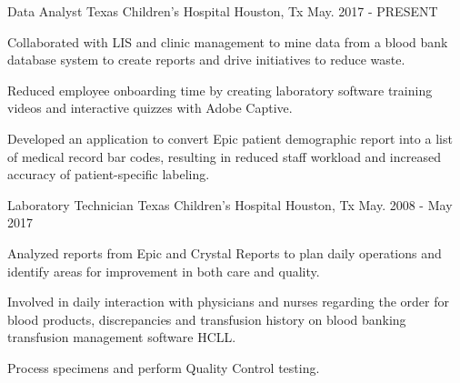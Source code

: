 

\begin{cventries}
	
	
	
	\cventry
	{Data Analyst} %
	{Texas Children's Hospital} %
	{Houston, Tx} %
	{May. 2017 - PRESENT} %
	{
		\begin{cvitems} %
			\item {Collaborated with LIS and clinic management to mine data from a blood bank database system to create reports and drive initiatives to reduce waste.}
			\item {Reduced employee onboarding time by creating laboratory software training videos and interactive quizzes with Adobe Captive.}
			\item {Developed an application to convert Epic patient demographic report into a list of medical record bar codes, resulting in reduced staff workload and increased accuracy of patient-specific labeling.}
		\end{cvitems}
	}
	
	
	\cventry
	{Laboratory Technician} %
	{Texas Children's Hospital} %
	{Houston, Tx} %
	{May. 2008 - May 2017} %
	{
		\begin{cvitems} %
			\item {Analyzed reports from Epic and Crystal Reports to plan daily operations and identify areas for improvement in both care and quality.}
			\item {Involved in daily interaction with physicians and nurses regarding the order for blood products, discrepancies and transfusion history
				on blood banking  transfusion management software HCLL.}
			\item {Process specimens and perform Quality Control testing.}
		\end{cvitems}
	}
\end{cventries}
